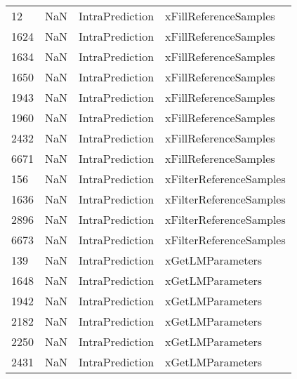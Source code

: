 \begin{tabular}{llll}
12   &                   NaN &            IntraPrediction &                     xFillReferenceSamples \\
1624 &                   NaN &            IntraPrediction &                     xFillReferenceSamples \\
1634 &                   NaN &            IntraPrediction &                     xFillReferenceSamples \\
1650 &                   NaN &            IntraPrediction &                     xFillReferenceSamples \\
1943 &                   NaN &            IntraPrediction &                     xFillReferenceSamples \\
1960 &                   NaN &            IntraPrediction &                     xFillReferenceSamples \\
2432 &                   NaN &            IntraPrediction &                     xFillReferenceSamples \\
6671 &                   NaN &            IntraPrediction &                     xFillReferenceSamples \\
156  &                   NaN &            IntraPrediction &                   xFilterReferenceSamples \\
1636 &                   NaN &            IntraPrediction &                   xFilterReferenceSamples \\
2896 &                   NaN &            IntraPrediction &                   xFilterReferenceSamples \\
6673 &                   NaN &            IntraPrediction &                   xFilterReferenceSamples \\
139  &                   NaN &            IntraPrediction &                          xGetLMParameters \\
1648 &                   NaN &            IntraPrediction &                          xGetLMParameters \\
1942 &                   NaN &            IntraPrediction &                          xGetLMParameters \\
2182 &                   NaN &            IntraPrediction &                          xGetLMParameters \\
2250 &                   NaN &            IntraPrediction &                          xGetLMParameters \\
2431 &                   NaN &            IntraPrediction &                          xGetLMParameters \\

\end{tabular}
